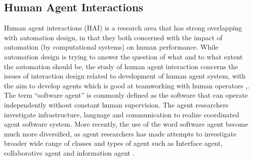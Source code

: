 
\subsection{Human Agent Interactions}
Human agent interactions (HAI) is a research area that has strong overlapping with automation design, in that they both concerned with the impact of automation (by computational systems) on human performance. While automation design is trying to answer the question of what and to what extent the automation should be, the study of human agent interaction concerns the issues of interaction design related to development of human agent system, with the aim to develop agents which is good at teamworking with human operators \cite{Bradshaw2011},\cite{Sukthankara}. \\

The term ``software agent'' is commonly defined as the software that can operate independently without constant human supervision\cite{Vlassis2007}. The agent researchers investigate infrastructure, language and communication to realize coordinated agent software system.\cite{Nwana1996} More recently, the use of the word software agent become much more diversified, as agent researchers has made attempts to investigate broader wide range of classes and types of agent such as Interface agent, collaborative agent and information agent \cite{Nwana1996}.  \\

